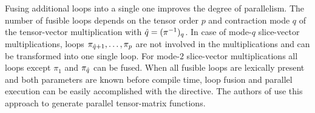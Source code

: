 Fusing additional loops into a single one improves the degree of parallelism.
The number of fusible loops depends on the tensor order $p$ and contraction mode $q$ of the tensor-vector multiplication with $\hat{q} = (\pi^{-1})_q$.
In case of mode-$q$ slice-vector multiplications, loops $\pi_{\hat{q}+1}, \dots, \pi_{p}$ are not involved in the multiplications and can be transformed into one single loop.
For mode-$2$ slice-vector multiplications all loops except $\pi_1$ and $\pi_{\hat{q}}$ can be fused.
When all fusible loops are lexically present and both parameters are known before compile time, loop fusion and parallel execution can be easily accomplished with the   directive.
The authors of \cite{li:2015:input} use this approach to generate parallel tensor-matrix functions.

